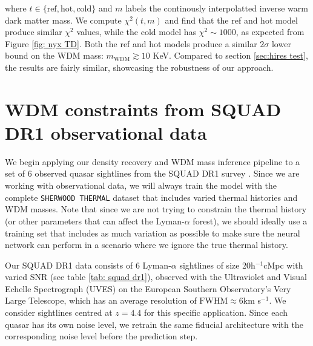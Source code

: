 where $t\in \{\mathrm{ref}, \mathrm{hot}, \mathrm{cold} \}$ and $m$ labels the continously interpolatted inverse warm dark matter mass. We compute $\chi^2(t,m)$ and find that the ref and hot model produce similar $\chi^2$ values, while the cold model has $\chi^2 \sim 1000$, as expected from Figure \ref{fig: nyx TD}. Both the ref and hot models produce a similar $2\sigma$ lower bound on the WDM mass: $m_{\mathrm{WDM}} \gtrsim 10$ KeV. Compared to section \ref{sec:hires test}, the results are fairly similar, showcasing the robustness of our approach.
































\section{WDM constraints from SQUAD DR1 observational data}\label{sec:inference squad}
We begin applying our density recovery and WDM mass inference pipeline to a set of 6 observed quasar sightlines from the SQUAD DR1 survey \cite{Murphy_2018}. Since we are working with observational data, we will always train the model with the complete \texttt{SHERWOOD THERMAL} dataset that includes varied thermal histories and WDM masses. Note that since we are not trying to constrain the thermal history (or other parameters that can affect the Lyman-$\alpha$ forest), we should ideally use a training set that includes as much variation as possible to make sure the neural network can perform in a scenario where we ignore the true thermal history.

Our SQUAD DR1  data consists of 6 Lyman-$\alpha$ sightlines of size 20h$^{-1}$cMpc with varied SNR (see table \ref{tab: squad dr1}), observed with the Ultraviolet and Visual Echelle Spectrograph (UVES) on the European Southern Observatory’s Very Large Telescope, which has an average resolution of $\mathrm{FWHM}\approx 6$km s$^{-1}$. We consider sightlines centred at $z=4.4$ for this specific application. Since each quasar has its own noise level, we retrain the same fiducial architecture with the corresponding noise level before the prediction step.

